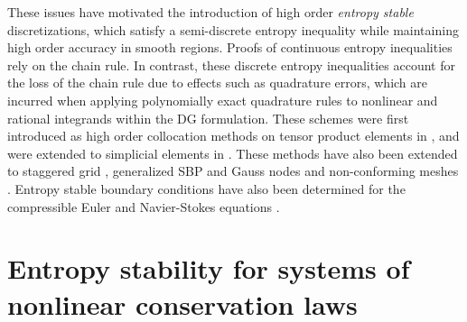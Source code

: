 \documentclass[review]{siamart0216}
\theoremstyle{assumption}
\newcommand{\note}[1]{{\color{blue}{#1}}}
\begin{document}
These issues have motivated the introduction of high order \textit{entropy stable} discretizations, which satisfy a semi-discrete entropy inequality while maintaining high order accuracy in smooth regions.  Proofs of continuous entropy inequalities rely on the chain rule.  In contrast, these discrete entropy inequalities account for the loss of the chain rule due to effects such as quadrature errors, which are incurred when applying polynomially exact quadrature rules to nonlinear and rational integrands within the DG formulation.  These schemes were first introduced as high order collocation methods on tensor product elements in \cite{fisher2013high, carpenter2014entropy, gassner2016split, gassner2017br1}, and were extended to simplicial elements in \cite{crean2017high, chen2017entropy, crean2018entropy, chan2017discretely, chan2018discretely}.  These methods have also been extended to staggered grid \cite{parsani2016entropy}, generalized SBP and Gauss nodes \cite{chan2018efficient} and non-conforming meshes \cite{friedrich2017entropy}.  Entropy stable boundary conditions have also been determined for the compressible Euler and Navier-Stokes equations \cite{parsani2015entropy, svard2018entropy}.  

\note{Finish: add Section description.  Talk about situations where the SBP or decoupled SBP property doesn't hold: triangles with reduced surface quadrature, GLL quads with GQ face quadratures, and hybrid couplings.}

\section{Entropy stability for systems of nonlinear conservation laws}
\end{document}
